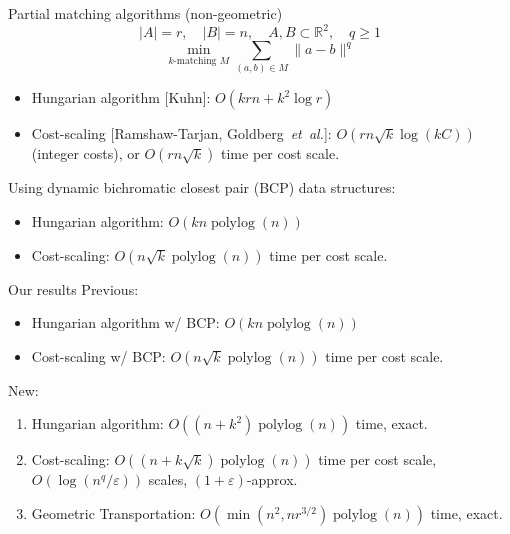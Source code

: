 \documentclass[xcolor={dvipsnames,usenames}]{beamer}
\newcommand{\etal}{\textit{et~al.}}
\newcommand{\reals}{\mathbb{R}}
\newcommand{\eps}{\varepsilon}
\DeclareMathOperator{\polylog}{polylog}
\begin{document}
\begin{frame}{Partial matching algorithms (non-geometric)}
\begin{equation*}
|A| = r, \quad |B| = n, \quad A, B \subset \reals^2, \quad q \geq 1 
\end{equation*}
\begin{equation*}
\min_{k \text{-matching } M}\sum_{(a, b) \in M} \|a - b\|^q
\end{equation*}
\begin{itemize}
\item Hungarian algorithm [Kuhn]: $O(krn + k^2\log r)$
\item Cost-scaling [Ramshaw-Tarjan, Goldberg~\etal]: $O(rn\sqrt{k}\log(kC))$ (integer costs),
	or $O(rn\sqrt{k})$ time per cost scale.
\end{itemize}
\pause
\vspace{10pt}
Using dynamic bichromatic closest pair (BCP) data structures:
\begin{itemize}
\item Hungarian algorithm: $O(kn\polylog(n))$
\item Cost-scaling: $O(n\sqrt{k}\polylog(n))$ time per cost scale.
\end{itemize}
\end{frame}

\begin{frame}{Our results}
Previous:
\begin{itemize}
\item Hungarian algorithm w/ BCP: $O(kn\polylog(n))$
\item Cost-scaling w/ BCP: $O(n\sqrt{k}\polylog(n))$ time per cost scale.
\end{itemize}
\pause
\vspace{10pt}

New:
\begin{enumerate}
\item Hungarian algorithm: $O((n+k^2)\polylog(n))$ time, exact.
\item Cost-scaling: $O((n+k\sqrt{k})\polylog(n))$ time per cost scale,
	$O(\log(n^q/\eps))$ scales, $(1+\eps)$-approx.
\pause
\vspace{10pt}
\item Geometric Transportation: $O(\min(n^2, nr^{3/2})\polylog(n))$ time, exact.
\end{enumerate}
\end{frame}
\end{document}

